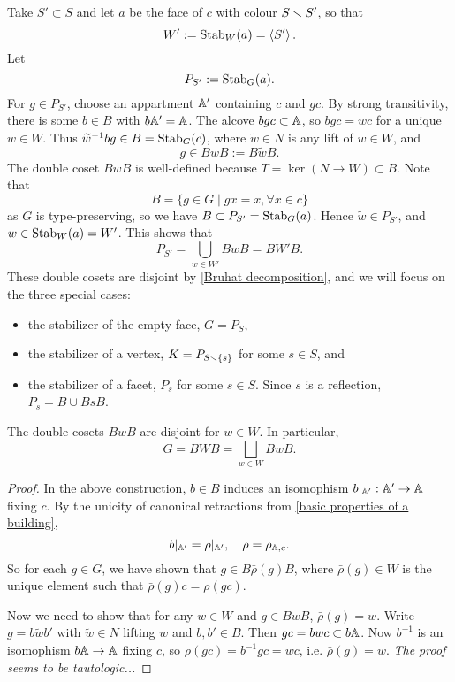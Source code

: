 \documentclass{article}
\begin{document}
Take $S'\subset S$ and let $a$ be the face of $c$ with colour $S\smallsetminus S'$,
so that \[W' := \operatorname{Stab}_W(a) = \left\langle S' \right\rangle.\]
Let \[P_{S'} := \operatorname{Stab}_G(a).\]
For $g\in P_{S'}$,
choose an appartment $\mathbb{A}'$ containing $c$ and $gc$.
By strong transitivity,
there is some $b\in B$ with $b\mathbb{A}' = \mathbb{A}$.
The alcove $bgc\subset\mathbb{A}$, so $bgc = wc$ for a unique $w\in W$.
Thus $\widetilde{w}^{-1}bg\in B = \operatorname{Stab}_G(c)$,
where $\tilde{w}\in N$ is any lift of $w\in W$,
and \[g\in BwB := B\tilde{w} B.\]
The double coset $BwB$ is well-defined because $T = \ker(N\to W)\subset B$.
Note that \[B = \{g\in G\mid gx = x,\forall x\in c\}\] as $G$ is type-preserving,
so we have $B\subset P_{S'} = \operatorname{Stab}_{G}(a)$.
Hence $\tilde{w}\in P_{S'}$,
and $w\in\operatorname{Stab}_{W}(a) = W'$.
This shows that \[P_{S'} = \bigcup_{w\in W'}BwB = BW'B.\]
These double cosets are disjoint by \cref{Bruhat decomposition},
and we will focus on the three special cases:\begin{itemize}
\item the stabilizer of the empty face, $G = P_{S}$,
\item the stabilizer of a vertex, $K = P_{S \smallsetminus \{s\}}$ for some $s\in S$, and
\item the stabilizer of a facet, $P_s$ for some $s\in S$. Since $s$ is a reflection, $P_s = B\cup BsB$.
\end{itemize}
\begin{theorem}\label{Bruhat decomposition}
    The double cosets $BwB$ are disjoint for $w\in W$.
    In particular, \[G = BW\!B = \bigsqcup_{w\in W}BwB.\]
\end{theorem}
\begin{proof}
    In the above construction, $b\in B$ induces
    an isomophism $b|_{\mathbb{A}'} : \mathbb{A}'\to\mathbb{A}$ fixing $c$.
    By the unicity of canonical retractions from \cref{basic properties of a building},
    \[b|_{\mathbb{A}'} = \rho|_{\mathbb{A}'},\quad \rho = \rho_{\mathbb{A}, c}.\]
    So for each $g\in G$,
    we have shown that $g\in B\bar{\rho}(g) B$,
    where $\bar{\rho}(g)\in W$ is the unique element such that $\bar{\rho}(g)c = \rho(gc)$.

    Now we need to show that for any $w\in W$ and $g\in BwB$, $\bar{\rho}(g) = w$.
    Write $g = b\tilde{w}b'$ with $\tilde{w}\in N$ lifting $w$ and $b, b'\in B$.
    Then $gc = bwc\subset b\mathbb{A}$.
    Now $b^{-1}$ is an isomophism $b\mathbb{A}\to \mathbb{A}$ fixing $c$,
    so $\rho(gc) = b^{-1}gc = wc$,
    i.e. $\bar{\rho}(g) = w$. \textit{The proof seems to be tautologic...}
\end{proof}
\end{document}
